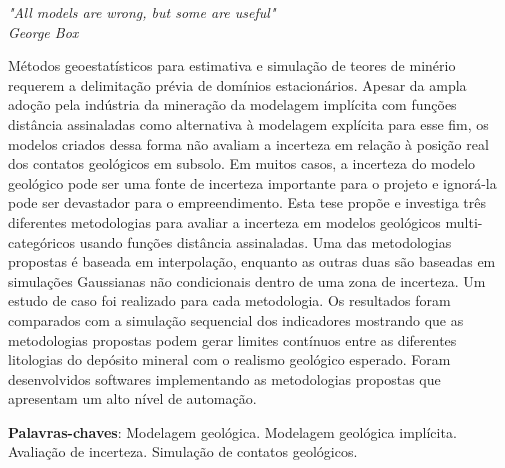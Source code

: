 \documentclass[
    oneside, %
	12pt,				%
	a4paper,			%
	chapter=TITLE,		%
	english,			%
	french,				%
	spanish,			%
	brazil				%
	]{dissertacao-ufrgs-abntex2}
\begin{document}
\begin{epigrafe}
    \vspace*{\fill}
	\begin{flushright}
		\textit{"All models are wrong, but some are useful"\\
		George Box}
	\end{flushright}
\end{epigrafe}


\setlength{\absparsep}{18pt} %
\begin{resumo}
    Métodos geoestatísticos para estimativa e simulação de teores de minério requerem a delimitação prévia de domínios estacionários. Apesar da ampla adoção pela indústria da mineração da modelagem implícita com funções distância assinaladas como alternativa à modelagem explícita para esse fim, os modelos criados dessa forma não avaliam a incerteza em relação à posição real dos contatos geológicos em subsolo. Em muitos casos, a incerteza do modelo geológico pode ser uma fonte de incerteza importante para o projeto e ignorá-la pode ser devastador para o empreendimento. Esta tese propõe e investiga três diferentes metodologias para avaliar a incerteza em modelos geológicos multi-categóricos usando funções distância assinaladas. Uma das metodologias propostas é baseada em interpolação, enquanto as outras duas são baseadas em simulações Gaussianas não condicionais dentro de uma zona de incerteza. Um estudo de caso foi realizado para cada metodologia. Os resultados foram comparados com a simulação sequencial dos indicadores mostrando que as metodologias propostas podem gerar limites contínuos entre as diferentes litologias do depósito mineral com o realismo geológico esperado. Foram desenvolvidos softwares implementando as metodologias propostas que apresentam um alto nível de automação.

 \textbf{Palavras-chaves}: Modelagem geológica. Modelagem geológica implícita. Avaliação de incerteza. Simulação de contatos geológicos.
\end{resumo}
\end{document}
